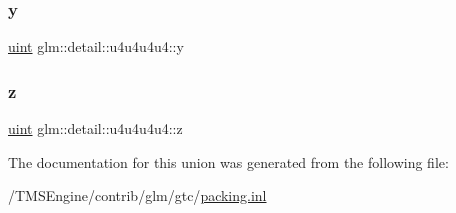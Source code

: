 \subsubsection{\texorpdfstring{y}{y}}
{\footnotesize\ttfamily \hyperlink{group__core__precision_ga4fd29415871152bfb5abd588334147c8}{uint} glm\+::detail\+::u4u4u4u4\+::y}

\mbox{\label{unionglm_1_1detail_1_1u4u4u4u4_a1635b8d41a367114239565da102ad6b9}} 
\subsubsection{\texorpdfstring{z}{z}}
{\footnotesize\ttfamily \hyperlink{group__core__precision_ga4fd29415871152bfb5abd588334147c8}{uint} glm\+::detail\+::u4u4u4u4\+::z}



The documentation for this union was generated from the following file\+:\begin{DoxyCompactItemize}
\item 
/\+T\+M\+S\+Engine/contrib/glm/gtc/\hyperlink{packing_8inl}{packing.\+inl}\end{DoxyCompactItemize}
